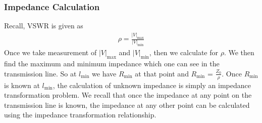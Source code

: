 \subsubsection{Impedance Calculation}
Recall, VSWR is given as
\begin{align}
\rho = \frac{|V|_\max}{|V|_\min}
\end{align}
Once we take measurement of $|V|_\max$ and $|V|_\min$, then we calculate for $ \rho $. We then find the maximum and minimum impedance which one can see in the transmission line. So at $l_\min$ we have $R_\min$ at that point and $R_\min$ = $\frac{Z_0}{\rho}$. Once $R_\min$ is known at $l_\min$, the calculation of unknown impedance is simply an impedance transformation problem. We recall that once the impedance at any point on the transmission line is known, the impedance at any other point can be calculated using the impedance transformation relationship.

